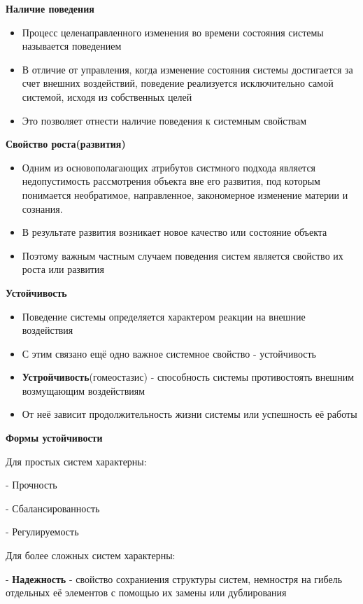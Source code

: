 \documentclass[a4paper]{article}
\begin{document}
	\textbf{Наличие поведения}
	\begin{itemize}
		\item Процесс целенаправленного изменения во времени состояния системы называется поведением
		\item В отличие от управления, когда изменение состояния системы достигается за счет внешних воздействий, поведение реализуется исключительно самой системой, исходя из собственных целей
		\item  Это позволяет отнести наличие поведения к системным свойствам
	\end{itemize}

	\textbf{Свойство роста(развития)}
		\begin{itemize}
		\item Одним из основополагающих атрибутов систмного подхода является недопустимость рассмотрения объекта вне его развития, под которым понимается необратимое, направленное, закономерное изменение материи и сознания.
		\item В результате развития возникает новое качество или состояние объекта
		\item  Поэтому важным частным случаем поведения систем является свойство их роста или развития
	\end{itemize}

	\textbf{Устойчивость}
	\begin{itemize}
		\item Поведение системы определяется характером реакции на внешние воздействия
		\item С этим связано ещё одно важное системное свойство - устойчивость
		\item \textbf{Устройчивость}(гомеостазис) - способность системы противостоять внешним возмущающим воздействиям
		\item  От неё зависит продолжительность жизни системы или успешность её работы
	\end{itemize}

	\textbf{Формы устойчивости}
	
	Для простых систем характерны:
	
	- Прочность
	
	- Сбалансированность
	
	- Регулируемость
	
	Для более сложных систем характерны:
	
	- \textbf{Надежность} - свойство сохраниения структуры систем, немностря на гибель отдельных её элементов с помощью их замены или дублирования
	
\end{document}
